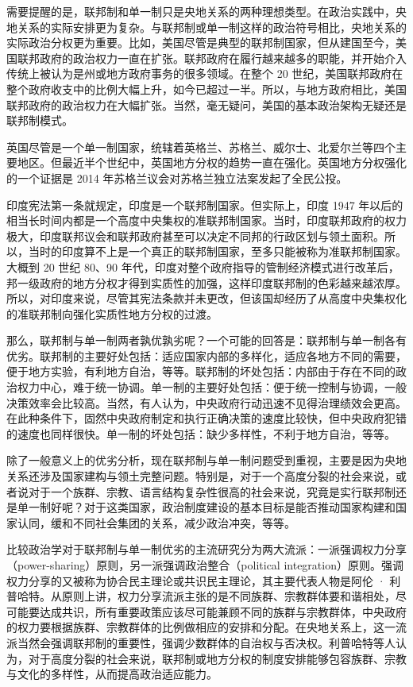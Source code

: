 需要提醒的是，联邦制和单一制只是央地关系的两种理想类型。在政治实践中，央地关系的实际安排更为复杂。与联邦制或单一制这样的政治符号相比，央地关系的实际政治分权更为重要。比如，美国尽管是典型的联邦制国家，但从建国至今，美国联邦政府的政治权力一直在扩张。联邦政府在履行越来越多的职能，并开始介入传统上被认为是州或地方政府事务的很多领域。在整个 20 世纪，美国联邦政府在整个政府收支中的比例大幅上升，如今已超过一半。所以，与地方政府相比，美国联邦政府的政治权力在大幅扩张。当然，毫无疑问，美国的基本政治架构无疑还是联邦制模式。

英国尽管是一个单一制国家，统辖着英格兰、苏格兰、威尔士、北爱尔兰等四个主要地区。但最近半个世纪中，英国地方分权的趋势一直在强化。英国地方分权强化的一个证据是 2014 年苏格兰议会对苏格兰独立法案发起了全民公投。

印度宪法第一条就规定，印度是一个联邦制国家。但实际上，印度 1947 年以后的相当长时间内都是一个高度中央集权的准联邦制国家。当时，印度联邦政府的权力极大，印度联邦议会和联邦政府甚至可以决定不同邦的行政区划与领土面积。所以，当时的印度算不上是一个真正的联邦制国家，至多只能被称为准联邦制国家。大概到 20 世纪 80、90 年代，印度对整个政府指导的管制经济模式进行改革后，邦一级政府的地方分权才得到实质性的加强，这样印度联邦制的色彩越来越浓厚。所以，对印度来说，尽管其宪法条款并未更改，但该国却经历了从高度中央集权化的准联邦制向强化实质性地方分权的过渡。

那么，联邦制与单一制两者孰优孰劣呢？一个可能的回答是：联邦制与单一制各有优劣。联邦制的主要好处包括：适应国家内部的多样化，适应各地方不同的需要，便于地方实验，有利地方自治，等等。联邦制的坏处包括：内部由于存在不同的政治权力中心，难于统一协调。单一制的主要好处包括：便于统一控制与协调，一般决策效率会比较高。当然，有人认为，中央政府行动迅速不见得治理绩效会更高。在此种条件下，固然中央政府制定和执行正确决策的速度比较快，但中央政府犯错的速度也同样很快。单一制的坏处包括：缺少多样性，不利于地方自治，等等。

除了一般意义上的优劣分析，现在联邦制与单一制问题受到重视，主要是因为央地关系还涉及国家建构与领土完整问题。特别是，对于一个高度分裂的社会来说，或者说对于一个族群、宗教、语言结构复杂性很高的社会来说，究竟是实行联邦制还是单一制好呢？对于这类国家，政治制度建设的基本目标是能否推动国家构建和国家认同，缓和不同社会集团的关系，减少政治冲突，等等。

比较政治学对于联邦制与单一制优劣的主流研究分为两大流派：一派强调权力分享（power-sharing）原则，另一派强调政治整合（political integration）原则。强调权力分享的又被称为协合民主理论或共识民主理论，其主要代表人物是阿伦 · 利普哈特。从原则上讲，权力分享流派主张的是不同族群、宗教群体要和谐相处，尽可能要达成共识，所有重要政策应该尽可能兼顾不同的族群与宗教群体，中央政府的权力要根据族群、宗教群体的比例做相应的安排和分配。在央地关系上，这一流派当然会强调联邦制的重要性，强调少数群体的自治权与否决权。利普哈特等人认为，对于高度分裂的社会来说，联邦制或地方分权的制度安排能够包容族群、宗教与文化的多样性，从而提高政治适应能力。

